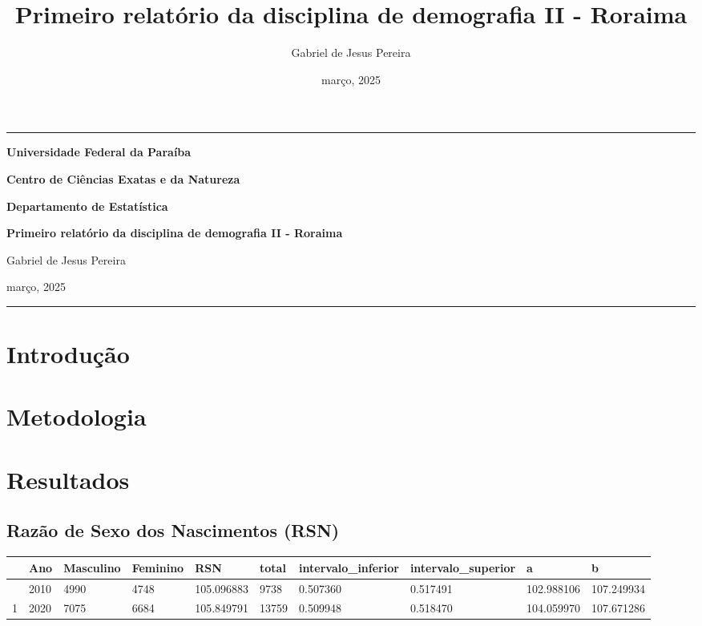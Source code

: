 \documentclass[
  12pt,
  a4paper,
]{scrreprt}
\title{Primeiro relatório da disciplina de demografia II - Roraima}
\author{Gabriel de Jesus Pereira}
\date{março, 2025}
\renewcommand*\contentsname{Índice}
\newcommand\contentsname{Índice}
\begin{document}
\cleardoublepage
\thispagestyle{empty}
{\centering
\noindent\rule{\textwidth}{0.5pt}

\vspace{2ex}

{\Large\bfseries Universidade Federal da Paraíba \par}
\vspace{1ex}
{\Large\bfseries Centro de Ciências Exatas e da Natureza \par}
\vspace{1ex}
{\Large\bfseries Departamento de Estatística \par}

\vfill

{\large\bfseries Primeiro relatório da disciplina de demografia II -
Roraima \par}

\vfill

{\large Gabriel de Jesus Pereira \par}
\vfill
{\normalsize março, 2025 \par}


\noindent\rule{\textwidth}{0.5pt}

}
\renewcommand*\contentsname{\centering Sumário \thispagestyle{empty}}
{
\hypersetup{linkcolor=}
\setcounter{tocdepth}{2}
\tableofcontents
}

\section{Introdução}\label{introduuxe7uxe3o}

\section{Metodologia}\label{metodologia}

\section{Resultados}\label{resultados}

\subsection{Razão de Sexo dos Nascimentos
(RSN)}\label{razuxe3o-de-sexo-dos-nascimentos-rsn}

\begin{longtable}[]{@{}llllllllll@{}}
\toprule\noalign{}
& Ano & Masculino & Feminino & RSN & total & intervalo\_inferior &
intervalo\_superior & a & b \\
\midrule\noalign{}
\endhead
\bottomrule\noalign{}
\endlastfoot
0 & 2010 & 4990 & 4748 & 105.096883 & 9738 & 0.507360 & 0.517491 &
102.988106 & 107.249934 \\
1 & 2020 & 7075 & 6684 & 105.849791 & 13759 & 0.509948 & 0.518470 &
104.059970 & 107.671286 \\
\end{longtable}
\end{document}
